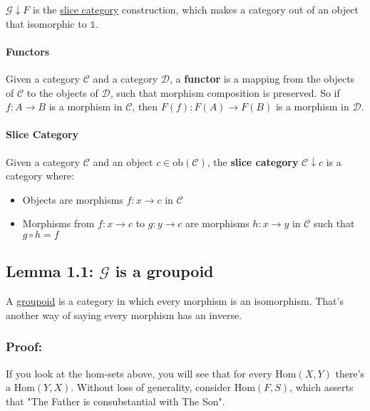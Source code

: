 \documentclass[11pt]{article}
\begin{document}
$\mathcal{G}\downarrow F$ is the \hyperref[sec:slice-category]{slice category} construction, which makes a category out of an object that isomorphic to $\mathbb{1}$.

\paragraph{Functors}
\label{sec:functors}

Given a category $\mathcal{C}$ and a category $\mathcal{D}$, a \textbf{functor} is a mapping from the objects of $\mathcal{C}$ to the objects of $\mathcal{D}$, such that morphism composition is preserved. So if $f : A \to B$ is a morphism in $\mathcal{C}$, then $F(f) : F(A) \to F(B)$ is a morphism in $\mathcal{D}$.

\paragraph{Slice Category}
\label{sec:slice-category}

Given a category $\mathcal{C}$ and an object $c \in \text{ob}(\mathcal{C})$, the \textbf{slice category} $\mathcal{C}\downarrow c$ is a category where:
\begin{itemize}
\item Objects are morphisms $f : x \to c$ in $\mathcal{C}$
\item Morphisms from $f : x \to c$ to $g : y \to c$ are morphisms $h : x \to y$ in $\mathcal{C}$ such that $g \circ h = f$
\end{itemize}

\subsection{Lemma 1.1: $\mathcal{G}$ is a groupoid}
\label{sec:lemma-groupoid}

A \href{https://math.jhu.edu/~eriehl/context.pdf#page=25}{groupoid} is a category in which every morphism is an isomorphism. That's another way of saying every morphism has an inverse.

\subsubsection{Proof:}
\label{sec:proof-groupoid}

If you look at the hom-sets above, you will see that for every $\text{Hom}(X,Y)$ there's a $\text{Hom}(Y,X)$. Without loss of generality, consider $\text{Hom}(F,S)$, which asserts that "The Father is consubstantial with The Son".
\end{document}
